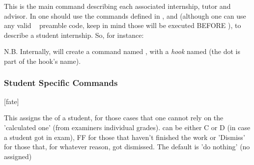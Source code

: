 \documentclass[dctools,english,tocdepth=3,secdepth=3]{ufrgscca} %
\begin{document}
\begin{Macros}{\NewInternshipStudent}
    \begin{Syntax}%
    \end{Syntax}
    This is the main command describing each  associated internship, tutor and advisor. In  one should use the commands defined in , and  (although one can use  any valid \LaTeXe~ preamble code, keep in mind those will be executed BEFORE \Macro{\begin{document}}{}), to describe a student internship.
        So, for instance:
        \begin{stcode}[st=d.newstudentB]
        \end{stcode}


        N.B. Internally, \Macro{\NewInternshipStudent}{} will create a command named \Macro{\studentname}{}, with a \emph{hook} named  (the dot is part of the hook's name).
    \end{Macros}


\subsubsection{Student Specific Commands}\label{student-specific-commands}
\begin{Macros}{\studentFate}
	\begin{Syntax}%
		\Macro{\studentFate}[fate]{}
	\end{Syntax}
This assigns the  of a student, for those cases that one cannot rely on the 'calculated one' (from examiners individual grades).  can be either C or D (in case a student got in exam), FF for those that haven't finished the work or 'Dismiss' for those that, for whatever reason, got dismissed. The default is 'do nothing' (no  assigned)
\end{Macros}
\end{document}
